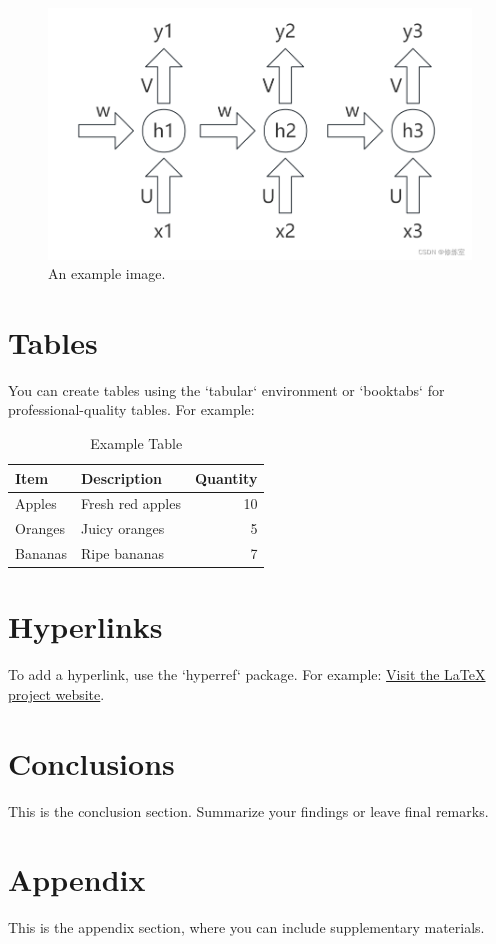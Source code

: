\documentclass[12pt,a4paper]{article}
\begin{document}
\begin{figure}[!htb]
    \centering
    \includegraphics[width=1\textwidth]{../Pic/pic1.png} %
    \caption{An example image.}
    \label{fig:example}
\end{figure}

\section{Tables}
You can create tables using the `tabular` environment or `booktabs` for professional-quality tables. For example:

\begin{table}[h!]
\centering
\caption{Example Table}
\begin{tabular}{@{}llr@{}}
\toprule
\textbf{Item} & \textbf{Description} & \textbf{Quantity} \\ \midrule
Apples        & Fresh red apples     & 10                \\
Oranges       & Juicy oranges        & 5                 \\
Bananas       & Ripe bananas         & 7                 \\ \bottomrule
\end{tabular}
\label{tab:example}
\end{table}

\section{Hyperlinks}
To add a hyperlink, use the `hyperref` package. For example:
\href{https://www.latex-project.org/}{Visit the LaTeX project website}.

\section{Conclusions}
This is the conclusion section. Summarize your findings or leave final remarks.

\newpage
\appendix
\section{Appendix}
This is the appendix section, where you can include supplementary materials.
\end{document}
